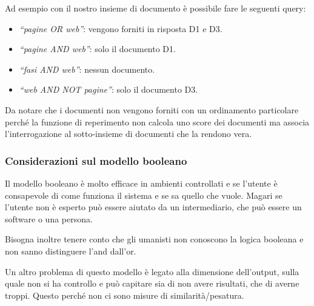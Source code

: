 


\noindent Ad esempio con il nostro insieme di documento è possibile fare le seguenti query:

\begin{itemize}
	\item \textit{``pagine OR web''}: vengono forniti in risposta D1 e D3.
	\item \textit{``pagine AND web''}: solo il documento D1.
	\item \textit{``fasi AND web''}: nessun documento.
	\item \textit{``web AND NOT pagine''}: solo il documento D3. 	
\end{itemize}

\noindent Da notare che i documenti non vengono forniti con un ordinamento particolare perché la funzione di reperimento non calcola uno score dei documenti ma associa l'interrogazione al sotto-insieme di documenti che la rendono vera.

\subsubsection{Considerazioni sul modello booleano}

Il modello booleano è molto efficace in ambienti controllati e se l'utente è consapevole di come funziona il sistema e se sa quello che vuole. Magari se l'utente non è esperto può essere aiutato da un intermediario, che può essere un software o una persona.

Bisogna inoltre tenere conto che gli umanisti non conoscono la logica booleana e non sanno distinguere l'and dall'or.

Un altro problema di questo modello è legato alla dimensione dell'output, sulla quale non si ha controllo e può capitare sia di non avere risultati, che di averne troppi. Questo perché non ci sono misure di similarità/pesatura.

